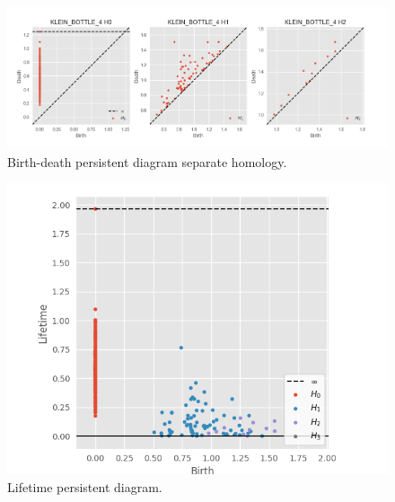 \documentclass[11pt,a4paper]{report}
\begin{document}
              \begin{figure}[H]
                \centering
                \includegraphics[width=\linewidth]{./ripser/klein4_sep.png}
                \caption{Birth-death persistent diagram separate homology.}
                \label{fig:sep hom}
              \end{figure}

              \begin{figure}[H]
                \centering
                \includegraphics[width=0.5\linewidth, scale=0.5]{./ripser/klein4_lifetime.png}
                \caption{Lifetime persistent diagram.}
                \label{fig:sep hom}
              \end{figure}



\end{document}
